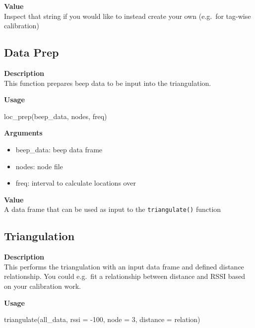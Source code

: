 \documentclass[
]{book}
\newenvironment{Shaded}{\begin{snugshade}}{\end{snugshade}}
\newcommand{\AttributeTok}[1]{\textcolor[rgb]{0.77,0.63,0.00}{#1}}
\newcommand{\DecValTok}[1]{\textcolor[rgb]{0.00,0.00,0.81}{#1}}
\newcommand{\FunctionTok}[1]{\textcolor[rgb]{0.00,0.00,0.00}{#1}}
\newcommand{\NormalTok}[1]{#1}
\newcommand{\SpecialCharTok}[1]{\textcolor[rgb]{0.00,0.00,0.00}{#1}}
\providecommand{\tightlist}{%
  \setlength{\itemsep}{0pt}\setlength{\parskip}{0pt}}
\begin{document}
\textbf{Value}\\
Inspect that string if you would like to instead create your own (e.g.~for tag-wise calibration)

\hypertarget{data-prep}{%
\subsection{Data Prep}\label{data-prep}}

\textbf{Description}\\
This function prepares beep data to be input into the triangulation.

\textbf{Usage}

\begin{Shaded}
\begin{Highlighting}[]
\FunctionTok{loc\_prep}\NormalTok{(beep\_data, nodes, freq) }
\end{Highlighting}
\end{Shaded}

\textbf{Arguments}

\begin{itemize}
\tightlist
\item
  beep\_data: beep data frame\\
\item
  nodes: node file\\
\item
  freq: interval to calculate locations over
\end{itemize}

\textbf{Value}\\
A data frame that can be used as input to the \texttt{triangulate()} function

\hypertarget{triangulation}{%
\subsection{Triangulation}\label{triangulation}}

\textbf{Description}\\
This performs the triangulation with an input data frame and defined distance relationship. You could e.g.~fit a relationship between distance and RSSI based on your calibration work.

\textbf{Usage}

\begin{Shaded}
\begin{Highlighting}[]
\FunctionTok{triangulate}\NormalTok{(all\_data, }\AttributeTok{rssi =} \SpecialCharTok{{-}}\DecValTok{100}\NormalTok{, }\AttributeTok{node =} \DecValTok{3}\NormalTok{, }\AttributeTok{distance =}\NormalTok{ relation)}
\end{Highlighting}
\end{Shaded}
\end{document}
